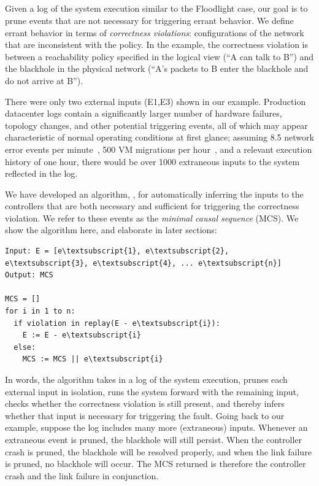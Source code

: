 {\subsection{\SIMULATOR{}}
\label{sec:causal_analysis}

Given a log of the system execution similar to the Floodlight case,
our goal is to prune events that are not
necessary for triggering errant behavior. We define errant behavior in terms
of {\em correctness violations}:
configurations of the network that are inconsistent
with the policy. In the example, the correctness violation is between a
reachability policy specified in the logical view (``A can talk to B'')
and the blackhole in the physical network (``A's packets to B enter the
blackhole and do not arrive at B'').

There were only two external inputs (E1,E3) shown in our example.
Production datacenter logs contain
a significantly larger number of hardware failures, topology changes,
and other potential triggering events,
all of which may appear characteristic of normal operating
conditions at first glance; assuming 8.5 network error events per
minute~\cite{Greenberg:2009:VSF:1592568.1592576}, 500 VM migrations per
hour~\cite{Soundararajan:2010:CBS:1899928.1899941}, and a relevant execution
history of one hour, there would be over 1000 extraneous inputs to the system
reflected in the log.

We have developed an algorithm, \simulator{}, for automatically inferring the inputs to the
controllers that are both necessary and sufficient for triggering the correctness violation. We
refer to these events as the {\em minimal causal sequence} (MCS). We show
the algorithm here, and elaborate in later sections:

\begin{Verbatim}[commandchars=\\\{\}]
Input: E = [e\textsubscript{1}, e\textsubscript{2}, e\textsubscript{3}, e\textsubscript{4}, ... e\textsubscript{n}]
Output: MCS

MCS = []
for i in 1 to n:
  if violation in replay(E - e\textsubscript{i}):
    E := E - e\textsubscript{i}
  else:
    MCS := MCS || e\textsubscript{i}
\end{Verbatim}

\noindent In words, the algorithm takes in a log of the system execution,
prunes each external input in isolation,
runs the system forward with the remaining input, checks whether the
correctness violation is still present, and thereby infers whether that input is
necessary for triggering the fault. Going back to our example, suppose the
log includes many more (extraneous) inputs. Whenever an
extraneous event is pruned, the blackhole will still persist. When
the controller crash is pruned, the blackhole will be resolved properly, and
when the link failure is pruned, no blackhole will occur. The MCS returned
is therefore the controller crash and the link failure in conjunction.

}
